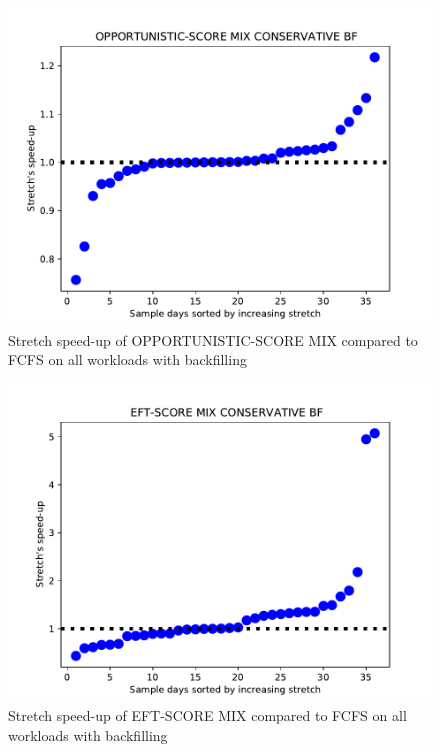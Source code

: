 \documentclass[conference,10pt]{IEEEtran}
\begin{document}
\begin{figure}\centering\includegraphics[width=1\linewidth]{../MBSS/plot/Scatter/scatter_mean_stretch_all_workloads_bf_OPPORTUNISTIC-SCORE-MIX-CONSERVATIVE-BF.pdf}\caption{Stretch speed-up of OPPORTUNISTIC-SCORE MIX compared to FCFS on all workloads with backfilling}\end{figure}
\begin{figure}\centering\includegraphics[width=1\linewidth]{../MBSS/plot/Scatter/scatter_mean_stretch_all_workloads_bf_EFT-SCORE-MIX-CONSERVATIVE-BF.pdf}\caption{Stretch speed-up of EFT-SCORE MIX compared to FCFS on all workloads with backfilling}\end{figure}
\end{document}

